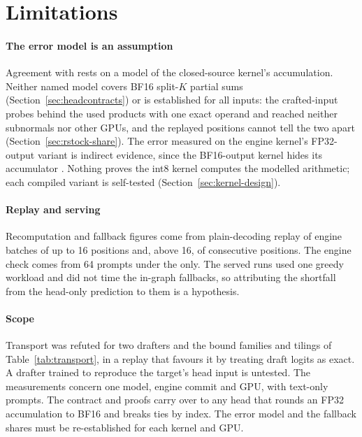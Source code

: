 \section{Limitations}\label{sec:discussion}\label{sec:limits}

\paragraph{The error model is an assumption} Agreement with \Rstock{} rests on a model of the closed-source kernel's accumulation. Neither named model covers BF16 split-$K$ partial sums (Section~\ref{sec:headcontracts}) or is established for all inputs: the crafted-input probes behind the \modelhopper{} used products with one exact operand and reached neither subnormals nor other GPUs, and the replayed positions cannot tell the two apart (Section~\ref{sec:rstock-share}). The error measured on the engine kernel's FP32-output variant is indirect evidence, since the BF16-output kernel hides its accumulator . Nothing proves the int8 kernel computes the modelled arithmetic; each compiled variant is self-tested (Section~\ref{sec:kernel-design}).

\paragraph{Replay and serving} Recomputation and fallback figures come from plain-decoding replay of engine batches of up to 16 positions and, above 16, of consecutive positions. The engine check comes from 64 prompts under the \modelcons{} only. The served runs used one greedy workload and did not time the in-graph fallbacks, so attributing the shortfall from the head-only prediction to them is a hypothesis.

\paragraph{Scope} Transport was refuted for two drafters and the bound families and tilings of Table~\ref{tab:transport}, in a replay that favours it by treating draft logits as exact. A drafter trained to reproduce the target's head input is untested. The measurements concern one model, engine commit and GPU, with text-only prompts. The contract and proofs carry over to any head that rounds an FP32 accumulation to BF16 and breaks ties by index. The error model and the fallback shares must be re-established for each kernel and GPU.

